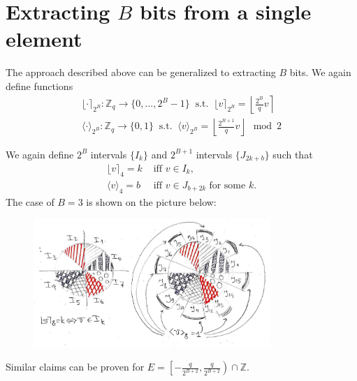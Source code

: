 \documentclass[12pt]{article}
\newcommand{\Z}{\mathbb{Z}}
\begin{document}
\section{Extracting $B$ bits from a single element}
\label{sec:Bbits}
The approach described above can be generalized to extracting $B$ bits.
We again define functions
\begin{align*}
\lfloor \cdot \rceil_{2^B}: \Z_q \rightarrow \{0, \ldots, 2^B - 1\}\;\;\text{s.t.}\;\; \lfloor v \rceil_{2^B} = \left\lfloor \frac{2^B}{q} v\right\rceil\\
\langle \cdot \rangle_{2^B}: \Z_q \rightarrow \{0, 1\}\;\;\text{s.t.}\;\; \langle v \rangle_{2^B} = \left\lfloor \frac{2^{B+1}}{q} v\right\rfloor \mod 2
\end{align*}

We again define $2^B$ intervals $\{I_k\}$ and $2^{B + 1}$ intervals $\{J_{2k + b}\}$ such that
\begin{align*}
\lfloor v \rceil_4 = k&\text{ iff }v \in I_k,\\
\langle v \rangle_4 = b&\text{ iff }v \in J_{b + 2k}\;\text{for some }k.
\end{align*}
The case of $B = 3$ is shown on the picture below:
\begin{figure}[H]
    \centering
    \includegraphics[width=0.8\textwidth]{3bits_pic.jpg}
\end{figure}

Similar claims can be proven for $E = \left[-\frac{q}{2^{B+2}}, \frac{q}{2^{B+2}}\right) \cap \Z$.
\end{document}
